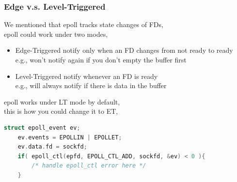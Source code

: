 \documentclass[aspectratio=43]{beamer}
\begin{document}
\begin{frame}[fragile]
  \frametitle{Edge v.s. Level-Triggered}
    \hspace*{2em} \begin{minipage}{.8\textwidth}
   We mentioned that epoll tracks state changes of FDs,\\
   epoll could work under two modes,
   \begin{itemize}
   \item Edge-Triggered {\scriptsize notify only when an FD changes from not ready to ready}\\
   {\footnotesize e.g., won't notify again if you don't empty the buffer first }
   \item Level-Triggered {\scriptsize notify whenever an FD is ready}\\
   {\footnotesize e.g., will always notify if there is data in the buffer }
   \end{itemize}
   
   epoll works under LT mode by default,\\this is how you could change it to ET,
   \begin{lstlisting}[language=C++,basicstyle=\ttfamily\footnotesize,commentstyle=\color{commgreen},keywordstyle=\color{blue},breaklines=true]
    struct epoll_event ev;
    ev.events = EPOLLIN | EPOLLET;
    ev.data.fd = sockfd;
    if( epoll_ctl(epfd, EPOLL_CTL_ADD, sockfd, &ev) < 0 ){
        /* handle epoll_ctl error here */
    }
   \end{lstlisting}
   
   \end{minipage}
\end{frame}
\end{document}
